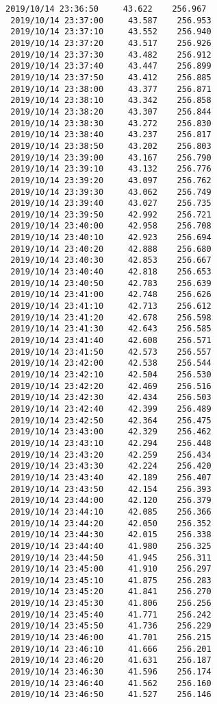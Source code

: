 \documentclass[11pt]{article}
\begin{document}
\begin{Verbatim}[commandchars=\\\{\}]
 2019/10/14 23:36:50     43.622    256.967
 2019/10/14 23:37:00     43.587    256.953
 2019/10/14 23:37:10     43.552    256.940
 2019/10/14 23:37:20     43.517    256.926
 2019/10/14 23:37:30     43.482    256.912
 2019/10/14 23:37:40     43.447    256.899
 2019/10/14 23:37:50     43.412    256.885
 2019/10/14 23:38:00     43.377    256.871
 2019/10/14 23:38:10     43.342    256.858
 2019/10/14 23:38:20     43.307    256.844
 2019/10/14 23:38:30     43.272    256.830
 2019/10/14 23:38:40     43.237    256.817
 2019/10/14 23:38:50     43.202    256.803
 2019/10/14 23:39:00     43.167    256.790
 2019/10/14 23:39:10     43.132    256.776
 2019/10/14 23:39:20     43.097    256.762
 2019/10/14 23:39:30     43.062    256.749
 2019/10/14 23:39:40     43.027    256.735
 2019/10/14 23:39:50     42.992    256.721
 2019/10/14 23:40:00     42.958    256.708
 2019/10/14 23:40:10     42.923    256.694
 2019/10/14 23:40:20     42.888    256.680
 2019/10/14 23:40:30     42.853    256.667
 2019/10/14 23:40:40     42.818    256.653
 2019/10/14 23:40:50     42.783    256.639
 2019/10/14 23:41:00     42.748    256.626
 2019/10/14 23:41:10     42.713    256.612
 2019/10/14 23:41:20     42.678    256.598
 2019/10/14 23:41:30     42.643    256.585
 2019/10/14 23:41:40     42.608    256.571
 2019/10/14 23:41:50     42.573    256.557
 2019/10/14 23:42:00     42.538    256.544
 2019/10/14 23:42:10     42.504    256.530
 2019/10/14 23:42:20     42.469    256.516
 2019/10/14 23:42:30     42.434    256.503
 2019/10/14 23:42:40     42.399    256.489
 2019/10/14 23:42:50     42.364    256.475
 2019/10/14 23:43:00     42.329    256.462
 2019/10/14 23:43:10     42.294    256.448
 2019/10/14 23:43:20     42.259    256.434
 2019/10/14 23:43:30     42.224    256.420
 2019/10/14 23:43:40     42.189    256.407
 2019/10/14 23:43:50     42.154    256.393
 2019/10/14 23:44:00     42.120    256.379
 2019/10/14 23:44:10     42.085    256.366
 2019/10/14 23:44:20     42.050    256.352
 2019/10/14 23:44:30     42.015    256.338
 2019/10/14 23:44:40     41.980    256.325
 2019/10/14 23:44:50     41.945    256.311
 2019/10/14 23:45:00     41.910    256.297
 2019/10/14 23:45:10     41.875    256.283
 2019/10/14 23:45:20     41.841    256.270
 2019/10/14 23:45:30     41.806    256.256
 2019/10/14 23:45:40     41.771    256.242
 2019/10/14 23:45:50     41.736    256.229
 2019/10/14 23:46:00     41.701    256.215
 2019/10/14 23:46:10     41.666    256.201
 2019/10/14 23:46:20     41.631    256.187
 2019/10/14 23:46:30     41.596    256.174
 2019/10/14 23:46:40     41.562    256.160
 2019/10/14 23:46:50     41.527    256.146

\end{Verbatim}
\end{document}

